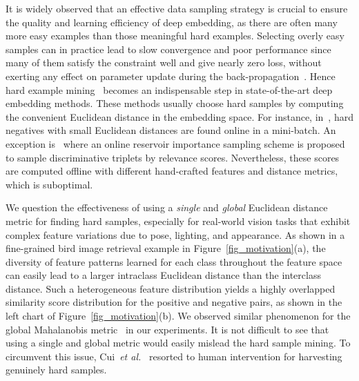 \documentclass{article}
\newcommand{\etal}{\emph{et al.}}
\begin{document}
It is widely observed that an effective data sampling strategy is crucial to ensure the quality and learning efficiency of deep embedding, as there are often many more easy examples than those meaningful hard examples.
Selecting overly easy samples can in practice lead to slow convergence and poor performance since many of them satisfy the constraint well and give nearly zero loss, without exerting any effect on parameter update during the back-propagation~\cite{YinCui2016}.
Hence hard example mining~\cite{Felzenszwalb2010} becomes an indispensable step in state-of-the-art deep embedding methods. These methods usually choose hard samples by computing the convenient Euclidean distance in the embedding space. For instance, in~\cite{Schroff2015,songCVPR16}, hard negatives with small Euclidean distances are found online in a mini-batch. An exception is~\cite{Wang2014} where an online reservoir importance sampling scheme is proposed to sample discriminative triplets by relevance scores. Nevertheless, these scores are computed offline with different hand-crafted features and distance metrics, which is suboptimal.

We question the effectiveness of using a \emph{single} and \emph{global} Euclidean distance metric for finding hard samples, especially for real-world vision tasks that exhibit complex feature variations due to pose, lighting, and appearance.
As shown in a fine-grained bird image retrieval example in Figure~\ref{fig_motivation}(a), the diversity of feature patterns learned for each class throughout the feature space can easily lead to a larger intraclass Euclidean distance than the interclass distance.
Such a heterogeneous feature distribution yields a highly overlapped similarity score distribution for the positive and negative pairs, as shown in the left chart of Figure~\ref{fig_motivation}(b).
We observed similar phenomenon for the global Mahalanobis metric~\cite{EricPXing2003,SCHHoi2006,Goldberger2005,Weinberger2009,Mensink2013} in our experiments.
It is not difficult to see that using a single and global metric would easily mislead the hard sample mining.
To circumvent this issue, Cui~\etal~\cite{YinCui2016} resorted to human intervention for harvesting genuinely hard samples.
\end{document}
